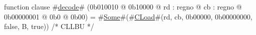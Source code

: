 function clause #\hyperref[zdecode]{decode}# (0b010010 @ 0b10000 @ rd : regno @ cb : regno @ 0b00000001 @ 0b0 @ 0b00) = #\hyperref[zSome]{Some}#(#\hyperref[zCLoad]{CLoad}#(rd, cb, 0b00000, 0b00000000, false, B, true)) /* CLLBU */
